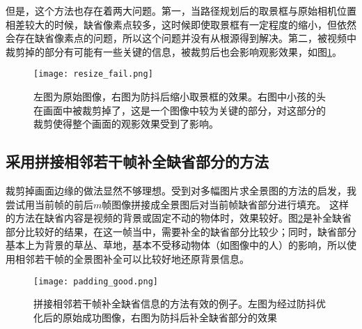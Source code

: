 \documentclass[journal, a4paper]{IEEEtran}
\begin{document}
  但是，这个方法也存在着两大问题。第一，当路径规划后的取景框与原始相机位置相差较大的时候，缺省像素点较多，这时候即使取景框有一定程度的缩小，但依然会存在缺省像素点的问题，所以这个问题并没有从根源得到解决。第二，被视频中裁剪掉的部分有可能有一些关键的信息，被裁剪后也会影响观影效果，如图\ref{fig:resize_fail}。
    \begin{figure}[!hbt]
    \begin{center}
    \texttt{[image: resize\_fail.png]}
    \caption{左图为原始图像，右图为防抖后缩小取景框的效果。右图中小孩的头在画面中被裁剪掉了，这是一个图像中较为关键的部分，对这部分的裁剪使得整个画面的观影效果受到了影响。}
    \label{fig:resize_fail}
    \end{center}
  \end{figure}

\subsection{采用拼接相邻若干帧补全缺省部分的方法}
  裁剪掉画面边缘的做法显然不够理想。受到对多幅图片求全景图的方法的启发，我尝试用当前帧的前后$m$帧图像拼接成全景图后对当前帧缺省部分进行填充。
    这样的方法在缺省内容是视频的背景或固定不动的物体时，效果较好。图\ref{fig:padding_good}是补全缺省部分比较好的结果，在这一帧当中，需要补全的缺省部分比较少；同时，缺省部分基本上为背景的草丛、草地，基本不受移动物体（如图像中的人）的影响，所以使用相邻若干帧的全景图补全可以比较好地还原背景信息。\\
    \begin{figure}[!hbt]
    \begin{center}
    \texttt{[image: padding\_good.png]}
    \caption{拼接相邻若干帧补全缺省信息的方法有效的例子。左图为经过防抖优化后的原始成功图像，右图为防抖后补全缺省部分的效果}
    \label{fig:padding_good}
    \end{center}
  \end{figure}
    
\end{document}
